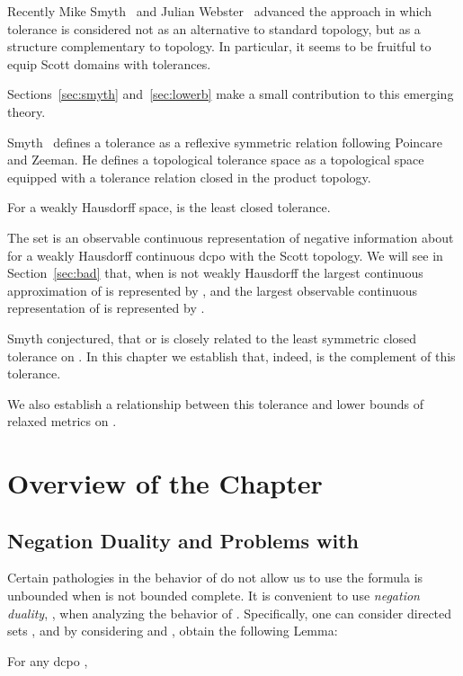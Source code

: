 Recently Mike Smyth~\cite{Smyth2} and Julian Webster~\cite{Webster}
advanced the approach in which tolerance is considered not as
an alternative to standard topology, but as a structure complementary 
to topology. In particular, it seems to be fruitful to equip
Scott domains with tolerances.

Sections~\ref{sec:smyth} 
and~\ref{sec:lowerb} make a small contribution to this emerging
theory.

Smyth~\cite{Smyth2} defines a tolerance as a reflexive symmetric
relation following Poincare and Zeeman. He defines a topological
tolerance space as a topological space equipped with a
tolerance relation closed in the product topology.

For a weakly Hausdorff space,  is
the least closed tolerance.

The set
 is an observable continuous representation of negative
information about 
for a weakly Hausdorff continuous dcpo  with the Scott
topology. We will see in Section~\ref{sec:bad} that, 
when  is not weakly Hausdorff the largest continuous
approximation of  is represented by
,
and the largest observable continuous representation of 
is represented by .

Smyth conjectured, that  or  is closely related to
the least symmetric closed tolerance on . In this chapter we
establish that, indeed, 
is the complement of this tolerance.

We also establish a relationship between this tolerance and
lower bounds of relaxed metrics on .

\section{Overview of the Chapter}

\subsection{Negation Duality and Problems with }

Certain pathologies in the behavior of  do not allow
us to use the formula 
 is
unbounded
when  is not bounded complete.
It is convenient to use {\em negation duality},
, when analyzing the behavior
of . Specifically, one can consider directed sets ,
and by considering  and , obtain the
following Lemma:

\begin{Lemma} For any dcpo , 

\end{Lemma}

